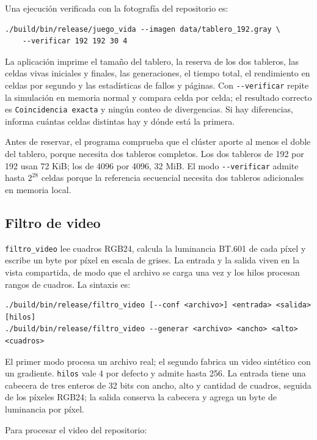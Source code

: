 Una ejecución verificada con la fotografía del repositorio es:

\begin{lstlisting}
./build/bin/release/juego_vida --imagen data/tablero_192.gray \
    --verificar 192 192 30 4
\end{lstlisting}

La aplicación imprime el tamaño del tablero, la reserva de los dos tableros, las celdas vivas iniciales y finales, las generaciones, el tiempo total, el rendimiento en celdas por segundo y las estadísticas de fallos y páginas. Con \texttt{-{}-verificar} repite la simulación en memoria normal y compara celda por celda; el resultado correcto es \texttt{Coincidencia exacta} y ningún conteo de divergencias. Si hay diferencias, informa cuántas celdas distintas hay y dónde está la primera.

Antes de reservar, el programa comprueba que el clúster aporte al menos el doble del tablero, porque necesita dos tableros completos. Los dos tableros de 192 por 192 usan 72 KiB; los de 4096 por 4096, 32 MiB. El modo \texttt{-{}-verificar} admite hasta $2^{28}$ celdas porque la referencia secuencial necesita dos tableros adicionales en memoria local.

\subsection{Filtro de video}\label{subsec:filtro-video}

\texttt{filtro\_video} lee cuadros RGB24, calcula la luminancia BT.601 de cada píxel y escribe un byte por píxel en escala de grises. La entrada y la salida viven en la vista compartida, de modo que el archivo se carga una vez y los hilos procesan rangos de cuadros. La sintaxis es:

\begin{lstlisting}
./build/bin/release/filtro_video [--conf <archivo>] <entrada> <salida> [hilos]
./build/bin/release/filtro_video --generar <archivo> <ancho> <alto> <cuadros>
\end{lstlisting}

El primer modo procesa un archivo real; el segundo fabrica un video sintético con un gradiente. \texttt{hilos} vale 4 por defecto y admite hasta 256. La entrada tiene una cabecera de tres enteros de 32 bits con ancho, alto y cantidad de cuadros, seguida de los píxeles RGB24; la salida conserva la cabecera y agrega un byte de luminancia por píxel.

Para procesar el video del repositorio:


